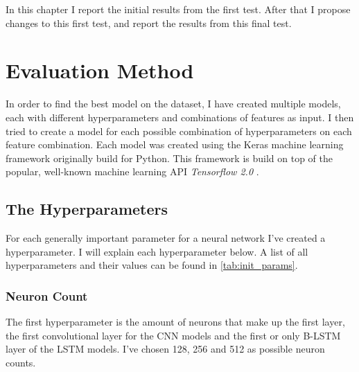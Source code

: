 In this chapter I report the initial results from the first test. After that I propose changes to this first test, and report the results from this final test.


\section{Evaluation Method}
\label{sec:eval_meth}
In order to find the best model on the dataset, I have created multiple models, each with different hyperparameters and combinations of features as input. I then tried to create a model for each possible combination of hyperparameters on each feature combination. Each model was created using the Keras \cite{Chollet2015keras} machine learning framework originally build for Python. This framework is build on top of the popular, well-known machine learning API \textit{Tensorflow 2.0} \cite{Tensorflow2015whitepaper}.

\subsection{The Hyperparameters}

For each generally important parameter for a neural network I've created a hyperparameter. I will explain each hyperparameter below. A list of all hyperparameters and their values can be found in \autoref{tab:init_params}.

\subsubsection{Neuron Count}
The first hyperparameter is the amount of neurons that make up the first layer, the first convolutional layer for the CNN models and the first or only B-LSTM layer of the LSTM models. I've chosen 128, 256 and 512 as possible neuron counts. 

